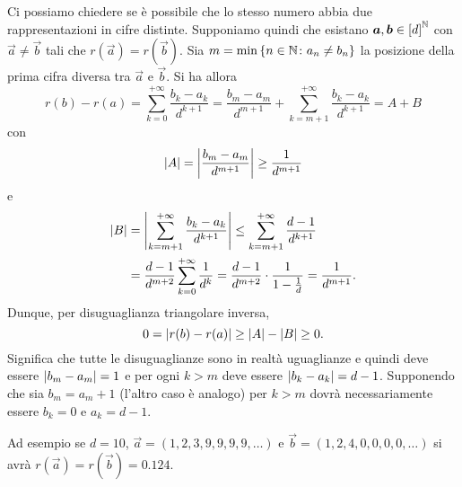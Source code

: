 Ci possiamo chiedere se è possibile che lo stesso numero 
abbia due rappresentazioni in cifre distinte.
Supponiamo quindi che esistano $\boldsymbol a,\boldsymbol b\in {\left[ d \right]}^\mathbb N$
con $\vec a \neq \vec b$ 
tali che $r(\vec a) = r(\vec b)$. 
Sia $m = \min{\left\{ n\in\mathbb N\colon a_n\neq b_n \right\}}$ la posizione 
della prima cifra diversa tra $\vec a$ e $\vec b$.
Si ha allora 
\[
 r(b) - r(a) = \sum_{k=0}^{+\infty}\frac{b_k - a_k}{d^{k+1}}
 = \frac{b_m - a_m}{d^{m+1}} + \sum_{k=m+1}^{+\infty} \frac{b_k - a_k}{d^{k+1}}
 = A+B
\]
con 
\[
{\left|A\right|} = {\left|\frac{b_m - a_m}{d^{m+1}}\right|} \ge \frac{1}{d^{m+1}}  
\]
e 
\begin{align*}
{\left|B\right|} &= {\left|\sum_{k=m+1}^{+\infty} \frac{b_k - a_k}{d^{k+1}}\right|}
        \le \sum_{k=m+1}^{+\infty} \frac{d-1}{d^{k+1}}\\
        &= \frac{d-1}{d^{m+2}}\sum_{k=0}^{+\infty}\frac{1}{d^k}
        = \frac{d-1}{d^{m+2}}\cdot \frac{1}{1-\frac 1 d} = \frac{1}{d^{m+1}}.
\end{align*}
Dunque, per disuguaglianza triangolare inversa,
\[
0 = {\left|r(b)-r(a)\right|}\ge {\left|A\right|} - {\left|B\right|} \ge 0.  
\]
Significa che tutte le disuguaglianze sono in realtà uguaglianze
e quindi deve essere ${\left|b_m-a_m\right|}=1$ 
e per ogni $k>m$ deve essere ${\left|b_k-a_k\right|}=d-1$. 
Supponendo che sia $b_m=a_m+1$ (l'altro caso è analogo)
per $k>m$ dovrà necessariamente essere $b_k=0$ e $a_k=d-1$.

Ad esempio se $d=10$, $\vec a = (1,2,3,9,9,9,9,\dots )$ 
e $\vec b = (1,2,4,0,0,0,0,\dots)$ si avrà 
$r(\vec a) = r(\vec b) = 0.124$.

